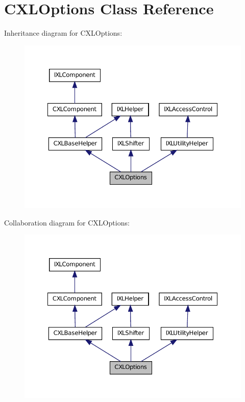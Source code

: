 \hypertarget{classCXLOptions}{
\section{CXLOptions Class Reference}
\label{classCXLOptions}
}


Inheritance diagram for CXLOptions:\nopagebreak
\begin{figure}[H]
\begin{center}
\leavevmode
\includegraphics[width=366pt]{classCXLOptions__inherit__graph}
\end{center}
\end{figure}


Collaboration diagram for CXLOptions:\nopagebreak
\begin{figure}[H]
\begin{center}
\leavevmode
\includegraphics[width=366pt]{classCXLOptions__coll__graph}
\end{center}
\end{figure}
